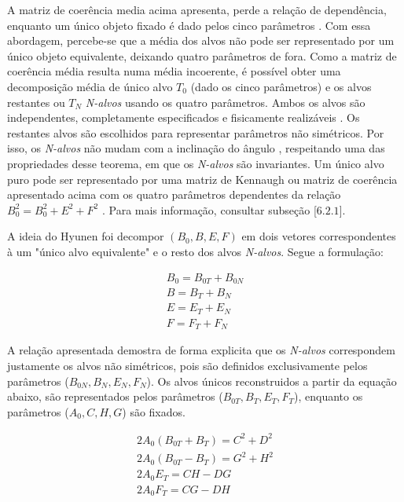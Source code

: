\documentclass{article}
\begin{document}
A matriz de coerência media acima apresenta, perde a relação de dependência, enquanto um único objeto fixado é dado pelos cinco parâmetros \cite{jong:2009}. Com essa abordagem, percebe-se que a média dos alvos não pode ser representado por um único objeto equivalente, deixando quatro parâmetros de fora. Como a matriz de coerência média resulta numa média incoerente, é possível obter uma decomposição média de único alvo $T_{0}$ (dado os cinco parâmetros) e os alvos restantes ou $T_{N}$ \textit{N-alvos} usando os quatro parâmetros. Ambos os alvos são independentes, completamente especificados e fisicamente realizáveis \cite{jong:2009}. Os restantes alvos são escolhidos para representar parâmetros não simétricos. Por isso, os \textit{N-alvos} não mudam com a inclinação do ângulo \cite{jong:2009}, respeitando uma das propriedades desse teorema, em que os \textit{N-alvos} são invariantes. Um único alvo puro pode ser representado por uma matriz de Kennaugh ou matriz de coerência apresentado acima com os quatro parâmetros dependentes da relação $B^2_{0}=B^2_{0}+E^2+F^2$ \cite{jong:2009}. Para mais informação, consultar \cite{jong:2009} subseção [$6.2.1$].

A ideia do Hyunen foi decompor $(B_{0}, B, E, F)$ em dois vetores correspondentes à um "único alvo equivalente" e o resto dos alvos \textit{N-alvos}. Segue a formulação:

\begin{equation}
    \begin{split}
            B_{0} = B_{0T} + B_{0N} \\ B = B_{T}+B_{N} \\
            E = E_{T} + E_{N} \\ F = F_{T}+F_{N}
    \end{split}
\end{equation}

A relação apresentada demostra de forma explicita que os \textit{N-alvos}  correspondem justamente os alvos não simétricos, pois são definidos exclusivamente pelos parâmetros ($B_{0N}, B_{N}, E_{N}, F_{N}$). Os alvos únicos reconstruidos a partir da equação abaixo, são representados pelos parâmetros ($B_{0T}, B_{T}, E_{T}, F_{T}$), enquanto os parâmetros ($A_{0} , C, H, G$) são fixados.

\begin{equation}
    \begin{split}
        2A_{0} (B_{0T} + B_{T} ) = C^2 + D^2 \\ 2A_{0} (B_{0T}-B_{T}) = G^2 + H^2\\
        2A_{0} E_{T} = CH-DG \\ 2A_{0} F_{T} = CG-DH
    \end{split}
\end{equation}
\end{document}
